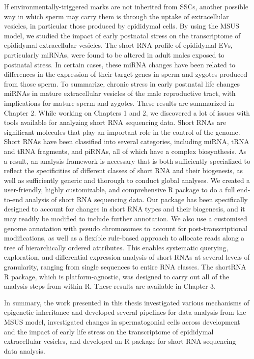 \documentclass[12pt,twoside]{reedthesis}
\begin{document}
If environmentally-triggered marks are not inherited from SSCs, another possible way in which sperm may carry them is through the uptake of extracellular vesicles, in particular those produced by epididymal cells. By using the MSUS model, we studied the impact of early postnatal stress on the transcriptome of epididymal extracellular vesicles. The short RNA profile of epididymal EVs, particularly miRNAs, were found to be altered in adult males exposed to postnatal stress. In certain cases, these miRNA changes have been related to differences in the expression of their target genes in sperm and zygotes produced from those sperm. To summarize, chronic stress in early postnatal life changes miRNAs in mature extracellular vesicles of the male reproductive tract, with implications for mature sperm and zygotes. These results are summarized in Chapter 2. While working on Chapters 1 and 2, we discovered a lot of issues with tools available for analyzing short RNA sequencing data. Short RNAs are significant molecules that play an important role in the control of the genome. Short RNAs have been classified into several categories, including miRNA, tRNA and tRNA fragments, and piRNAs, all of which have a complex biosynthesis. As a result, an analysis framework is necessary that is both sufficiently specialized to reflect the specificities of different classes of short RNA and their biogenesis, as well as sufficiently generic and thorough to conduct global analyses. We created a user-friendly, highly customizable, and comprehensive R package to do a full end-to-end analysis of short RNA sequencing data. Our package has been specifically designed to account for changes in short RNA types and their biogenesis, and it may readily be modified to include further annotation. We also use a customised genome annotation with pseudo chromosomes to account for post-transcriptional modifications, as well as a flexible rule-based approach to allocate reads along a tree of hierarchically ordered attributes. This enables systematic querying, exploration, and differential expression analysis of short RNAs at several levels of granularity, ranging from single sequences to entire RNA classes. The shortRNA R package, which is platform-agnostic, was designed to carry out all of the analysis steps from within R. These results are available in Chapter 3.

In summary, the work presented in this thesis investigated various mechanisms of epigenetic inheritance and developed several pipelines for data analysis from the MSUS model, investigated changes in spermatogonial cells across development and the impact of early life stress on the transcriptome of epididymal extracellular vesicles, and developed an R package for short RNA sequencing data analysis.
\end{document}
